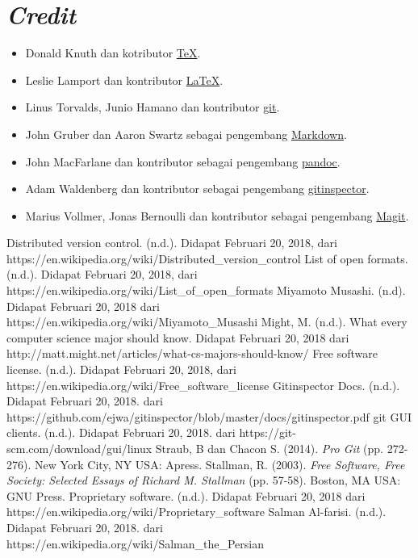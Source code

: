 \documentclass[a4paper,11pt]{article}
\begin{document}
\section{\emph{Credit}}
\label{sec:credit}
\begin{itemize}
\item Donald Knuth dan kotributor \href{https://www.tug.org/svn/texlive/trunk/}{\TeX}.
\item Leslie Lamport dan kontributor \href{https://www.latex-project.org/}{\LaTeX}.
\item Linus Torvalds, Junio Hamano dan kontributor \href{https://git-scm.com/}{git}.
\item John Gruber dan Aaron Swartz sebagai pengembang \href{https://daringfireball.net/projects/markdown}{Markdown}.
\item John MacFarlane dan kontributor sebagai pengembang \href{https://pandoc.org/}{pandoc}.
\item Adam Waldenberg dan kontributor sebagai pengembang \href{https://github.com/ejwa/gitinspector}{gitinspector}.
\item Marius Vollmer, Jonas Bernoulli dan kontributor sebagai pengembang \href{https://magit.vc/}{Magit}.
\end{itemize}



\begin{thebibliography}{99}
  Distributed version control.
  (n.d.).
  Didapat Februari 20, 2018, dari https://en.wikipedia.org/wiki/Distributed\_version\_control
  List of open formats.
  (n.d.).
  Didapat Februari 20, 2018, dari https://en.wikipedia.org/wiki/List\_of\_open\_formats
  Miyamoto Musashi.
  (n.d).
  Didapat Februari 20, 2018 dari https://en.wikipedia.org/wiki/Miyamoto\_Musashi
  Might, M.
  (n.d.).
  What every computer science major should know.
  Didapat Februari 20, 2018 dari http://matt.might.net/articles/what-cs-majors-should-know/
  Free software license.
  (n.d.).
  Didapat Februari 20, 2018, dari https://en.wikipedia.org/wiki/Free\_software\_license
  Gitinspector Docs.
  (n.d.).
  Didapat Februari 20, 2018. dari https://github.com/ejwa/gitinspector/blob/master/docs/gitinspector.pdf
  git GUI clients.
  (n.d.).
  Didapat Februari 20, 2018. dari https://git-scm.com/download/gui/linux
  Straub, B dan Chacon S.
  (2014).
  \emph{Pro Git} (pp. 272-276).
  New York City, NY USA: Apress.
  Stallman, R.
  (2003).
  \emph{Free Software, Free Society: Selected Essays of Richard M. Stallman} (pp. 57-58).
  Boston, MA USA: GNU Press.
  Proprietary software.
  (n.d.).
  Didapat Februari 20, 2018 dari https://en.wikipedia.org/wiki/Proprietary\_software
  Salman Al-farisi.
  (n.d.).
  Didapat Februari 20, 2018. dari https://en.wikipedia.org/wiki/Salman\_the\_Persian
\end{thebibliography}
\end{document}
